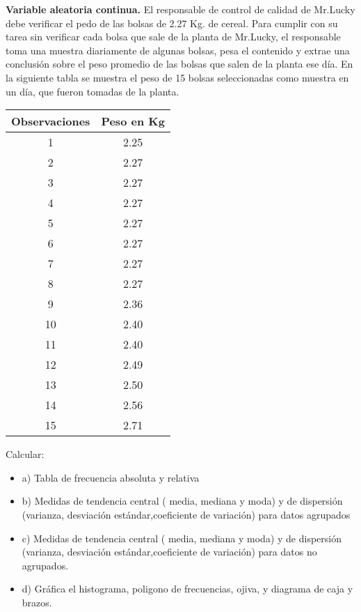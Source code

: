 \documentclass{../oxmathproblems}
\begin{document}
\begin{questions}

\miquestion \textbf{Variable aleatoria continua.}
El responsable de control de calidad de Mr.Lucky debe verificar el pedo de las bolsas de 2.27 Kg. de cereal. Para cumplir con su tarea sin verificar cada bolsa que sale de la planta de Mr.Lucky, el responsable toma una muestra diariamente de algunas bolsas, pesa el contenido y extrae una conclusión sobre el peso promedio de las bolsas que salen de la planta ese día. 
En la siguiente tabla se muestra el peso de 15 bolsas seleccionadas como muestra en un día, que fueron tomadas de la planta. 
\begin{center}
\begin{tabular}{ |c|c| } 
 \hline
 \textbf{Observaciones} & \textbf{Peso en Kg} \\ 
 \hline
 1 & 2.25 \\
 2  & 2.27 \\
 3 & 2.27\\ 
 4 & 2.27 \\ 
 5 & 2.27 \\ 
 6 & 2.27 \\ 
 7 & 2.27\\ 
 8 & 2.27 \\ 
 9 & 2.36 \\ 
 10 & 2.40 \\ 
11 & 2.40 \\ 
12 & 2.49 \\
13 & 2.50 \\ 
14 & 2.56 \\ 
15 & 2.71 \\ 
 \hline
\end{tabular}
\end{center}

Calcular: 

\begin{itemize}
\item  a) Tabla de frecuencia absoluta y relativa 
\item  b) Medidas de tendencia central ( media, mediana y moda) y de dispersión (varianza, desviación estándar,coeficiente de variación) para datos agrupados
\item  c) Medidas de tendencia central ( media, mediana y moda) y de dispersión (varianza, desviación estándar,coeficiente de variación) para datos no agrupados. 
\item d) Gráfica el histograma, poligono de frecuencias, ojiva, y  diagrama de caja y brazos. 
\end{itemize}



\end{questions}
\end{document}
